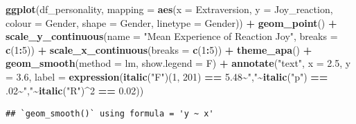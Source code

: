 \documentclass[
]{book}
\newenvironment{Shaded}{\begin{snugshade}}{\end{snugshade}}
\newcommand{\AttributeTok}[1]{\textcolor[rgb]{0.13,0.29,0.53}{#1}}
\newcommand{\DecValTok}[1]{\textcolor[rgb]{0.00,0.00,0.81}{#1}}
\newcommand{\FloatTok}[1]{\textcolor[rgb]{0.00,0.00,0.81}{#1}}
\newcommand{\FunctionTok}[1]{\textcolor[rgb]{0.13,0.29,0.53}{\textbf{#1}}}
\newcommand{\NormalTok}[1]{#1}
\newcommand{\SpecialCharTok}[1]{\textcolor[rgb]{0.81,0.36,0.00}{\textbf{#1}}}
\newcommand{\StringTok}[1]{\textcolor[rgb]{0.31,0.60,0.02}{#1}}
\begin{document}
\begin{Shaded}
\begin{Highlighting}[]
\FunctionTok{ggplot}\NormalTok{(df\_personality, }\AttributeTok{mapping =} \FunctionTok{aes}\NormalTok{(}\AttributeTok{x =}\NormalTok{ Extraversion, }
                                     \AttributeTok{y =}\NormalTok{ Joy\_reaction, }
                                     \AttributeTok{colour =}\NormalTok{ Gender, }
                                     \AttributeTok{shape =}\NormalTok{ Gender,}
                                     \AttributeTok{linetype =}\NormalTok{ Gender)) }\SpecialCharTok{+}
  \FunctionTok{geom\_point}\NormalTok{() }\SpecialCharTok{+}
  \FunctionTok{scale\_y\_continuous}\NormalTok{(}\AttributeTok{name =} \StringTok{"Mean Experience of Reaction Joy"}\NormalTok{, }\AttributeTok{breaks =} \FunctionTok{c}\NormalTok{(}\DecValTok{1}\SpecialCharTok{:}\DecValTok{5}\NormalTok{)) }\SpecialCharTok{+}
  \FunctionTok{scale\_x\_continuous}\NormalTok{(}\AttributeTok{breaks =} \FunctionTok{c}\NormalTok{(}\DecValTok{1}\SpecialCharTok{:}\DecValTok{5}\NormalTok{)) }\SpecialCharTok{+}
  \FunctionTok{theme\_apa}\NormalTok{() }\SpecialCharTok{+}
  \FunctionTok{geom\_smooth}\NormalTok{(}\AttributeTok{method =}\NormalTok{ lm, }\AttributeTok{show.legend =}\NormalTok{ F) }\SpecialCharTok{+}
  \FunctionTok{annotate}\NormalTok{(}\StringTok{"text"}\NormalTok{, }\AttributeTok{x =} \FloatTok{2.5}\NormalTok{, }\AttributeTok{y =} \FloatTok{3.6}\NormalTok{,}
           \AttributeTok{label =} \FunctionTok{expression}\NormalTok{(}\FunctionTok{italic}\NormalTok{(}\StringTok{"F"}\NormalTok{)(}\DecValTok{1}\NormalTok{, }\DecValTok{201}\NormalTok{) }\SpecialCharTok{==} \FloatTok{5.48}\SpecialCharTok{\textasciitilde{}}\StringTok{","}\SpecialCharTok{\textasciitilde{}}\FunctionTok{italic}\NormalTok{(}\StringTok{"p"}\NormalTok{) }\SpecialCharTok{==}\NormalTok{ .}\DecValTok{02}\SpecialCharTok{\textasciitilde{}}\StringTok{","}\SpecialCharTok{\textasciitilde{}}\FunctionTok{italic}\NormalTok{(}\StringTok{"R"}\NormalTok{)}\SpecialCharTok{\^{}}\DecValTok{2} \SpecialCharTok{==} \FloatTok{0.02}\NormalTok{))}
\end{Highlighting}
\end{Shaded}

\begin{verbatim}
## `geom_smooth()` using formula = 'y ~ x'
\end{verbatim}
\end{document}
